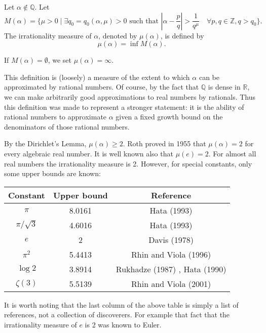 \documentclass[12pt]{article}
\begin{document}
Let $\alpha\not\in\mathbb Q$. 
Let $$M(\alpha)=\{\mu>0 \mid \exists q_0=q_0(\alpha,
\mu)>0
\mbox{ such that }
\left|\alpha-\frac pq\right|>\frac1{q^\mu} \quad
\forall p,q\in\mathbb Z, q>q_0\}.$$
The irrationality measure of $\alpha$,
denoted by $\mu(\alpha)$, is defined by
$$\mu(\alpha)=\inf M(\alpha).$$

If $M(\alpha)=\emptyset$, we set $\mu(\alpha)=\infty$.

This definition is (loosely) a measure of the extent to which $\alpha$ can be approximated by rational numbers.  Of course, by the fact that $\mathbb{Q}$ is dense in $\mathbb{R}$, we can make arbitrarily good approximations to real numbers by rationals.  Thus this definition was made to represent a stronger statement:  it is the ability of rational numbers to approximate $\alpha$ given a fixed growth bound on the denominators of those rational numbers.

By the Dirichlet's Lemma, $\mu(\alpha)\ge 2$.
Roth \cite{Roth955,Roth955b} 
proved in 1955 that
$\mu(\alpha)=2$ for every algebraic real number. 
It is well known also 
that $\mu(e)=2$. For almost all real numbers
the irrationality measure is 2.
However, for special constants, only some upper bounds
are known:

\begin{center}
\begin{tabular}{|c|c|c|}\hline
Constant & Upper bound & Reference \\ \hline 
$\pi$ & 8.0161 & Hata (1993) \cite{hata}\\ 
$\pi/\sqrt3$ & 4.6016 & Hata (1993) \cite{hata}\\
$e$ & 2 &  Davis (1978) \cite{davis978} \\
$\pi^2$ & 5.4413 & Rhin and Viola (1996) \cite{RhinViol996}\\ 
$\log2$ & 3.8914 & Rukhadze (1987) \cite{rukh}, Hata (1990) \cite{hata990}\\ 
$\zeta(3)$ & 5.5139 &  Rhin and Viola (2001) \cite{RhinViol001}\\  \hline
\end{tabular}
\end{center}

It is worth noting that the last column of the above table is simply a list of references, not a collection of discoverers.  For example that fact that the irrationality measure of $e$ is 2 was known to Euler.
\end{document}
